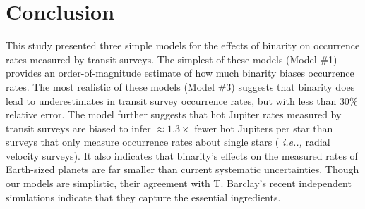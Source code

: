 \section{Conclusion}
\label{sec:conclusion}

This study presented three simple models for the effects of binarity on 
occurrence rates measured by transit surveys.
The simplest of these models (Model \#1) provides an order-of-magnitude 
estimate of how much binarity biases occurrence rates.
The most realistic of these models (Model \#3) suggests that binarity does 
lead to underestimates in transit survey occurrence rates, but with less than 
$30\%$ relative error.
The model further suggests that hot Jupiter rates measured by transit surveys 
are biased to infer $\approx 1.3\times$ fewer hot Jupiters per star than 
surveys that only measure occurrence rates about single stars ({\it 
i.e..,} radial velocity surveys).
It also indicates that binarity's effects on the measured 
rates of Earth-sized planets are far smaller than current 
systematic uncertainties.
Though our models are simplistic, their agreement with T. Barclay's recent 
independent simulations indicate that they capture the essential 
ingredients.
